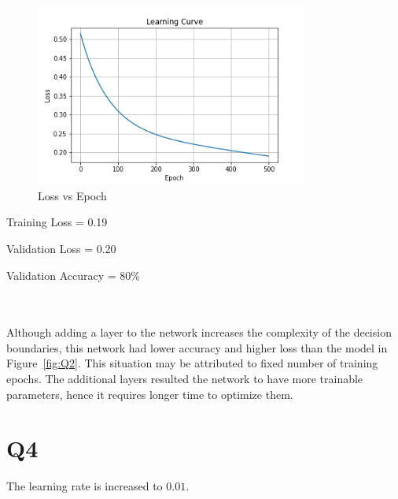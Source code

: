 \documentclass[11pt]{extarticle}
\begin{document}
\begin{figure}[h]
\centering
\includegraphics[width=0.8\textwidth]{Q3.png}
\caption{Loss vs Epoch}\label{fig:Q3}
\end{figure}
\begin{minipage}{0.3\textwidth}
    Training Loss = 0.19
\end{minipage}
\begin{minipage}{0.3\textwidth}
    Validation Loss = 0.20
\end{minipage}
\begin{minipage}{0.3\textwidth}
    Validation Accuracy = 80\%
\end{minipage}
\\
\\
Although adding a layer to the network increases the complexity of the decision boundaries, this network had lower accuracy and higher loss than the model in Figure~\ref{fig:Q2}. This situation may be attributed to fixed number of training epochs. The additional layers resulted the network to have more trainable parameters, hence it requires longer time to optimize them. 

\pagebreak

\section{Q4}

The learning rate is increased to $0.01$. 
\end{document}
